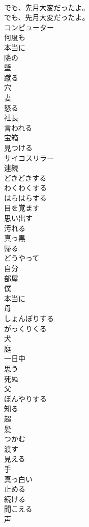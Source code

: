 \documentclass[8pt]{extreport}
\begin{document}
\begin{CJK}{UTF8}{min}
\\	でも、先月大変だったよ。	
\\	でも、先月大変だったよ。 
\\	コンピューター
\\	何度も
\\	本当に
\\	隣の
\\	壁
\\	蹴る
\\	穴
\\	妻
\\	怒る
\\	社長
\\	言われる
\\	宝箱
\\	見つける
\\	サイコスリラー
\\	連続
\\	どきどきする
\\	わくわくする
\\	はらはらする
\\	目を覚ます
\\	思い出す
\\	汚れる
\\	真っ黒
\\	帰る
\\	どうやって
\\	自分
\\	部屋
\\	僕
\\	本当に
\\	母
\\	しょんぼりする
\\	がっくりくる
\\	犬
\\	庭
\\	一日中
\\	思う
\\	死ぬ
\\	父
\\	ぼんやりする
\\	知る
\\	超
\\	髪
\\	つかむ
\\	渡す
\\	見える
\\	手
\\	真っ白い
\\	止める
\\	続ける
\\	聞こえる
\\	声

\end{CJK}
\end{document}
